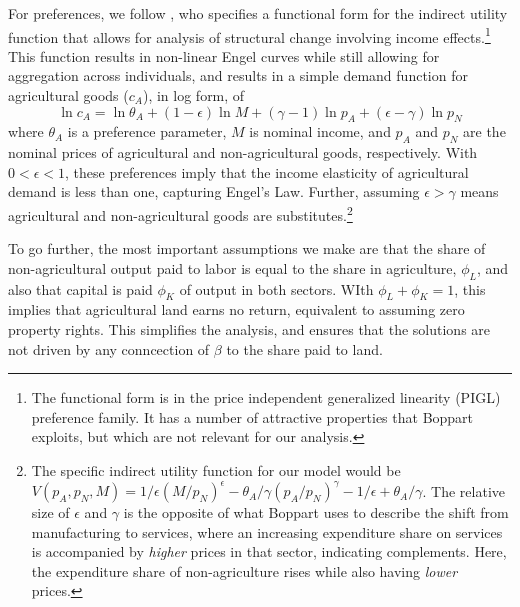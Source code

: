 \documentclass[11pt]{article}
\begin{document}
For preferences, we follow \cite{boppart2014}, who specifies a functional form for the indirect utility function that allows for analysis of structural change involving income effects.\footnote{The functional form is in the price independent generalized linearity (PIGL) preference family. It has a number of attractive properties that Boppart exploits, but which are not relevant for our analysis.} This function results in non-linear Engel curves while still allowing for aggregation across individuals, and results in a simple demand function for agricultural goods ($c_A$), in log form, of
\begin{equation}
    \ln c_A = \ln \theta_A + (1-\epsilon) \ln M + (\gamma - 1) \ln p_A + (\epsilon - \gamma) \ln p_N \label{EQ_ca_demand}
\end{equation}
where $\theta_A$ is a preference parameter, $M$ is nominal income, and $p_A$ and $p_N$ are the nominal prices of agricultural and non-agricultural goods, respectively. With $0 < \epsilon < 1$, these preferences imply that the income elasticity of agricultural demand is less than one, capturing Engel's Law. Further, assuming $\epsilon > \gamma$ means agricultural and non-agricultural goods are substitutes.\footnote{The specific indirect utility function for our model would be $V(p_A,p_N,M) = 1/\epsilon \left(M/p_N\right)^{\epsilon} - \theta_A/\gamma \left(p_A/p_N\right)^{\gamma} - 1/\epsilon + \theta_A/\gamma$. The relative size of $\epsilon$ and $\gamma$ is the opposite of what Boppart uses to describe the shift from manufacturing to services, where an increasing expenditure share on services is accompanied by \textit{higher} prices in that sector, indicating complements. Here, the expenditure share of non-agriculture rises while also having \textit{lower} prices.}

To go further, the most important assumptions we make are that the share of non-agricultural output paid to labor is equal to the share in agriculture, $\phi_L$, and also that capital is paid $\phi_K$ of output in both sectors. WIth $\phi_L + \phi_K = 1$, this implies that agricultural land earns no return, equivalent to assuming zero property rights. This simplifies the analysis, and ensures that the solutions are not driven by any conncection of $\beta$ to the share paid to land. 
\end{document}
